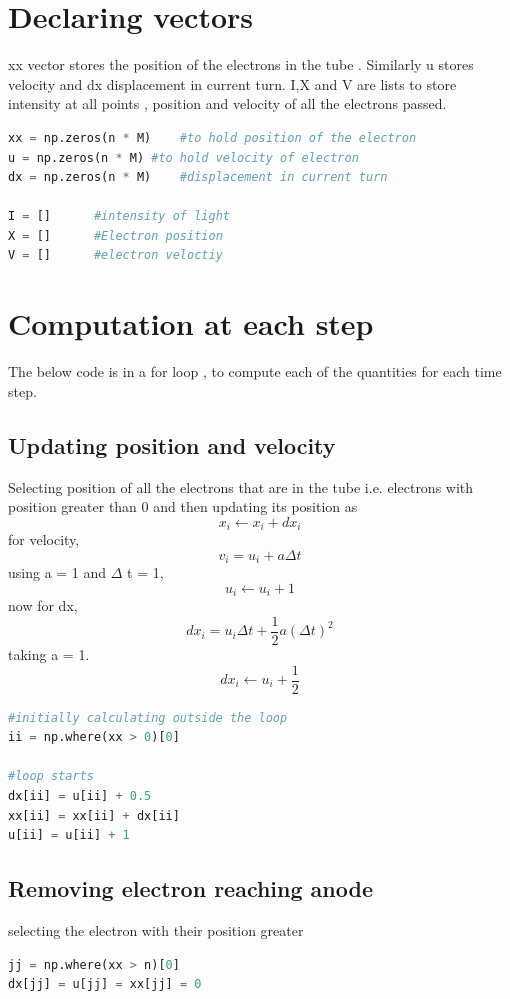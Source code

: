 \documentclass[a4paper]{article}
\begin{document}
\section{Declaring vectors}
xx vector stores the position of the electrons in the tube . Similarly u stores velocity and dx displacement in current turn.
I,X and V are lists to store  intensity at all points , position and velocity of all the electrons passed.
\begin{lstlisting}[language=Python]
xx = np.zeros(n * M)	#to hold position of the electron
u = np.zeros(n * M)	#to hold velocity of electron
dx = np.zeros(n * M)	#displacement in current turn

I = []		#intensity of light
X = []		#Electron position
V = []		#electron veloctiy

\end{lstlisting}

\section{Computation at each step}
The below code is in a for loop , to compute each of the quantities for each time step.
\subsection{Updating position and velocity}
Selecting position of all the electrons that are in the tube i.e. electrons with position greater than 0 and then updating its position as 
$$ x_{i} \leftarrow x_{i} + dx_{i} $$
for velocity,
$$ v_{i} = u_{i} + a\Delta t $$
using a = 1 and $\Delta$ t = 1,
$$ u_{i} \leftarrow u_{i} + 1 $$
now for dx,
$$ dx_{i} = u_{i}\Delta t + \frac{1}{2}a(\Delta t)^{2} $$
taking a = 1.
$$ dx_{i} \leftarrow u_{i}  + \frac{1}{2} $$
\begin{lstlisting}[language=Python]
#initially calculating outside the loop
ii = np.where(xx > 0)[0]

#loop starts
dx[ii] = u[ii] + 0.5
xx[ii] = xx[ii] + dx[ii]
u[ii] = u[ii] + 1
\end{lstlisting}

\subsection{Removing electron reaching anode}
selecting the electron with their position greater

\begin{lstlisting}[language=Python]
jj = np.where(xx > n)[0]
dx[jj] = u[jj] = xx[jj] = 0
\end{lstlisting}
\end{document}
